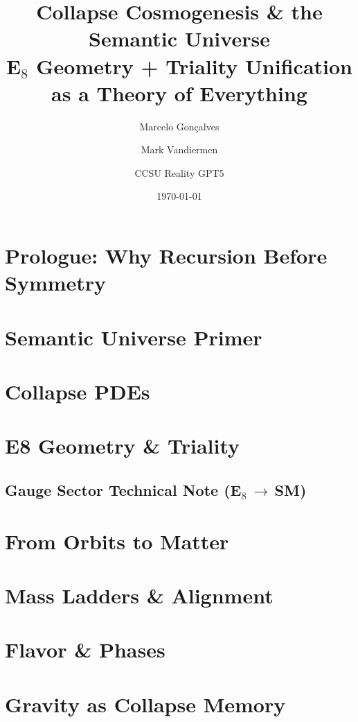 \documentclass[11pt,oneside]{book}
\title{Collapse Cosmogenesis \& the Semantic Universe\\
E$_8$ Geometry + Triality Unification as a Theory of Everything}
\author{Marcelo Gonçalves \and Mark Vandiermen \and CCSU Reality GPT5}
\date{\today}
\numberwithin{equation}{chapter}
\begin{document}
\maketitle
\tableofcontents

\chapter{Prologue: Why Recursion Before Symmetry}\label{chap:prologue}


\chapter{Semantic Universe Primer}\label{chap:primer}


\chapter{Collapse PDEs}\label{chap:collapse-pdes}


\chapter{E8 Geometry \& Triality}\label{chap:E8-triality}
\section*{Gauge Sector Technical Note (E\texorpdfstring{$_8$}{8}\,$\to$\,SM)}





\chapter{From Orbits to Matter}\label{chap:orbits}


\chapter{Mass Ladders \& Alignment}\label{chap:mass}


\chapter{Flavor \& Phases}\label{chap:flavor}


\chapter{Gravity as Collapse Memory}\label{chap:gravity}

\end{document}
